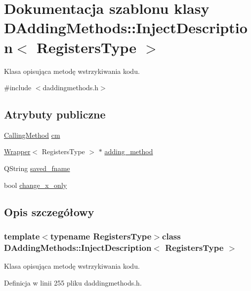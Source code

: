 \hypertarget{class_d_adding_methods_1_1_inject_description}{\section{Dokumentacja szablonu klasy D\-Adding\-Methods\-:\-:Inject\-Description$<$ Registers\-Type $>$}
\label{class_d_adding_methods_1_1_inject_description}
}


Klasa opisująca metodę wstrzykiwania kodu.  




{\ttfamily \#include $<$daddingmethods.\-h$>$}

\subsection*{Atrybuty publiczne}
\begin{DoxyCompactItemize}
\item 
\hyperlink{class_d_adding_methods_a8b52c07f1794d8c6cdd6f9b98be2bbf0}{Calling\-Method} \hyperlink{class_d_adding_methods_1_1_inject_description_a71f8164f1c9e433b6b22b5480dc5f066}{cm}
\item 
\hyperlink{class_d_adding_methods_1_1_wrapper}{Wrapper}$<$ Registers\-Type $>$ $\ast$ \hyperlink{class_d_adding_methods_1_1_inject_description_acea7bb1b146f912703e30039f200b538}{adding\-\_\-method}
\item 
Q\-String \hyperlink{class_d_adding_methods_1_1_inject_description_ab12b0b3cab069790363224252a2a9b22}{saved\-\_\-fname}
\item 
bool \hyperlink{class_d_adding_methods_1_1_inject_description_a8046652b0fae10f8e04e0678fd5961fd}{change\-\_\-x\-\_\-only}
\end{DoxyCompactItemize}


\subsection{Opis szczegółowy}
\subsubsection*{template$<$typename Registers\-Type$>$class D\-Adding\-Methods\-::\-Inject\-Description$<$ Registers\-Type $>$}

Klasa opisująca metodę wstrzykiwania kodu. 

Definicja w linii 255 pliku daddingmethods.\-h.



